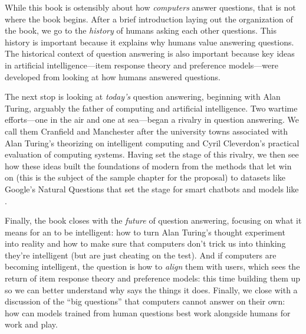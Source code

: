 
While this book is ostensibly about how \emph{computers} answer
questions, that is not where the book begins.
%
After a brief
introduction laying out the organization of the book, we go to the
\emph{history} of humans asking each other questions.
%
This history is important because it explains why humans value
answering questions.
%
The historical context of question answering is also important because key ideas in artificial intelligence---item response theory and preference models---were
developed from looking at how humans answered questions.

The next stop is looking at \emph{today's} question answering,
beginning with Alan Turing, arguably the father of computing and
artificial intelligence.
%
Two wartime efforts---one in the air and one at sea---began a rivalry in
question answering.  We call them Cranfield and Manchester after
the university towns associated with Alan Turing's theorizing on intelligent
computing and Cyril Cleverdon's practical evaluation of computing
systems.
%
Having set the stage of this rivalry, we then see how these ideas
built the foundations of modern  from the methods that let
\watson{} win on \jeopardy{}
%
\ifproposal
(this is the subject of the sample chapter for the proposal)
\fi
%
to datasets like Google's Natural Questions that set the stage for
smart chatbots and models like .

Finally, the book closes with the \emph{future} of question answering,
focusing on what it means for an  to be intelligent: how to
turn Alan Turing's thought experiment into reality and how to make
sure that computers don't trick us into thinking they're intelligent
(but are just cheating on the test).
%
And if computers are becoming intelligent, the question is how to
\emph{align} them with users, which sees the return of item response
theory and preference models: this time building them up so we can better
understand why  says the things it does.
%
Finally, we close with a discussion of the ``big questions'' that
computers cannot answer on their own: how can models trained
from human questions best work alongside humans for
work and play.


